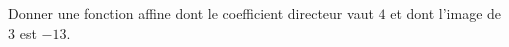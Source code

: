
\begin{exercice}\label{exosmath-0496}

    Donner une fonction affine dont le coefficient directeur vaut \( 4\) et dont l'image de \( 3\) est \( -13\).

\end{exercice}
